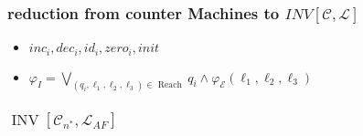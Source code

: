 \begin{frame}
    \frametitle{reduction from counter Machines to $INV[\mathcal{C},\mathcal{L}]$}
    \begin{itemize}
        \item $inc_i, dec_i, id_i, zero_i, init$
        \item $\varphi_{I}=\bigvee_{\left(q_{i}, \ell_{1}, \ell_{2}, \ell_{3}\right) \in \text { Reach }} q_{i} \wedge \varphi_{\mathcal{E}}\left(\ell_{1}, \ell_{2}, \ell_{3}\right) $
    \end{itemize}
\end{frame}
\begin{frame}
    \frametitle{$\operatorname{INV}\left[\mathcal{C}_{n^{*}}, \mathcal{L}_{A F}\right]$}
    \begin{itemize}
        
    \end{itemize}
\end{frame}
